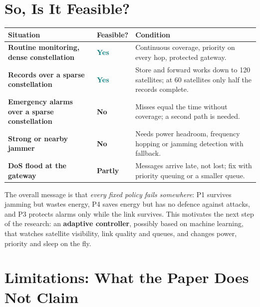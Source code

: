 \documentclass[11pt,a4paper]{article}
\newcommand{\kt}[1]{\textbf{\color{navy}#1}}
\begin{document}
\section{So, Is It Feasible?}

\begin{center}
\small
\begin{tabularx}{0.96\linewidth}{@{}>{\bfseries}l >{\centering\arraybackslash}p{1.4cm} X@{}}
\toprule
Situation & Feasible? & Condition \\
\midrule
Routine monitoring, dense constellation & \textcolor{teal}{\textbf{Yes}} & Continuous coverage, priority on every hop, protected gateway. \\
Records over a sparse constellation & \textcolor{teal}{\textbf{Yes}} & Store and forward works down to 120 satellites; at 60 satellites only half the records complete. \\
Emergency alarms over a sparse constellation & \textcolor{brick}{\textbf{No}} & Misses equal the time without coverage; a second path is needed. \\
Strong or nearby jammer & \textcolor{brick}{\textbf{No}} & Needs power headroom, frequency hopping or jamming detection with fallback. \\
DoS flood at the gateway & \textcolor{amber}{\textbf{Partly}} & Messages arrive late, not lost; fix with priority queuing or a smaller queue. \\
\bottomrule
\end{tabularx}
\end{center}

The overall message is that \emph{every fixed policy fails somewhere}: P1 survives jamming but wastes energy, P4 saves energy but has no defence against attacks, and P3 protects alarms only while the link survives. This motivates the next step of the research: an \kt{adaptive controller}, possibly based on machine learning, that watches satellite visibility, link quality and queues, and changes power, priority and sleep on the fly.

\section{Limitations: What the Paper Does Not Claim}
\end{document}
